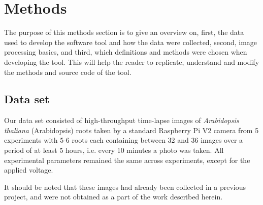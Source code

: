 
\chapter{Methods} %

\label{methods} %

%

The purpose of this methods section is to give an overview on, first, the data used to develop the software tool and how the data were collected, second, image processing basics, and third, %
which definitions and methods were chosen when developing the tool. This will help the reader to replicate, understand and modify the methods and source code of the tool. 

\section{Data set}\label{sec:data}

Our data set consisted of high-throughput time-lapse images of \textit{Arabidopsis thaliana} (Arabidopsis) roots taken by a standard Raspberry Pi V2 camera from 5 experiments with 5-6 roots each containing between 32 and 36 images over a period of at least 5 hours, i.e. every 10 minutes a photo was taken. 
All experimental parameters remained the same across experiments, except for the applied voltage.

It should be noted that these images had already been collected in a previous project, and were not obtained as a part of the work described herein.



